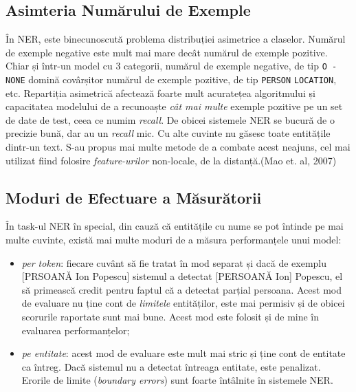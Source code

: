 \subsection{Asimteria Numărului de Exemple}
\label{subsec:example-assymetry}

În NER, este binecunoscută problema distribuției asimetrice a claselor. Numărul de exemple negative este mult mai mare decât numărul de exemple pozitive. Chiar și într-un model cu 3 categorii, numărul de exemple negative, de tip \texttt{O - NONE} domină covârșitor numărul de exemple pozitive, de tip \texttt{PERSON} \texttt{LOCATION}, etc. Repartiția asimetrică afectează foarte mult acuratețea algoritmului și capacitatea modelului de a recunoaște \textit{cât mai multe} exemple pozitive pe un set de date de test, ceea ce numim \textit{recall}. De obicei sistemele NER se bucură de o precizie bună, dar au un \textit{recall} mic. Cu alte cuvinte nu găsesc toate entitățile dintr-un text. S-au propus mai multe metode de a combate acest neajuns, cel mai utilizat fiind folosire \textit{feature-urilor} non-locale, de la distanță.(Mao et. al, 2007)\cite{Mao2007}

\subsection{Moduri de Efectuare a Măsurătorii}

În task-ul NER în special, din cauză că entitățile cu nume se pot întinde pe mai multe cuvinte, există mai multe moduri de a măsura performanțele unui model:

\begin{itemize}
\item \textit{per token}: fiecare cuvânt să fie tratat în mod separat și dacă de exemplu [PRSOANĂ Ion Popescu] sistemul a detectat [PERSOANĂ Ion] Popescu, el să primească credit pentru faptul că a detectat parțial persoana. Acest mod de evaluare nu ține cont de \textit{limitele} entităților, este mai permisiv și de obicei scorurile raportate sunt mai bune. Acest mod este folosit și de mine în evaluarea performanțelor;

\item \textit{pe entitate}: acest mod de evaluare este mult mai stric și ține cont de entitate ca întreg. Dacă sistemul nu a detectat întreaga entitate, este penalizat. Erorile de limite (\textit{boundary errors}) sunt foarte întâlnite în sistemele NER.

\end{itemize}

